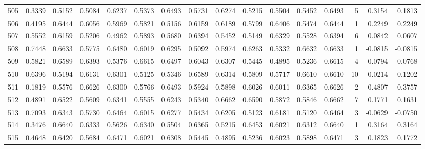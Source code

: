 \begin{tabular}{lrrrrrrrrrrrrrrr}
505 &      0.3339 &  0.5152 &  0.5084 &  0.6237 &  0.5373 &  0.6493 &  0.5731 &  0.6274 &  0.5215 &  0.5504 &   0.5452 &     0.6493 &      5 &                    0.3154 &                     0.1813 \\
506 &      0.4195 &  0.6444 &  0.6056 &  0.5969 &  0.5821 &  0.5156 &  0.6159 &  0.6189 &  0.5799 &  0.6406 &   0.5474 &     0.6444 &      1 &                    0.2249 &                     0.2249 \\
507 &      0.5552 &  0.6159 &  0.5206 &  0.4962 &  0.5893 &  0.5680 &  0.6394 &  0.5452 &  0.5149 &  0.6329 &   0.5528 &     0.6394 &      6 &                    0.0842 &                     0.0607 \\
508 &      0.7448 &  0.6633 &  0.5775 &  0.6480 &  0.6019 &  0.6295 &  0.5092 &  0.5974 &  0.6263 &  0.5332 &   0.6632 &     0.6633 &      1 &                   -0.0815 &                    -0.0815 \\
509 &      0.5821 &  0.6589 &  0.6393 &  0.5376 &  0.6615 &  0.6497 &  0.6043 &  0.6307 &  0.5445 &  0.4895 &   0.5236 &     0.6615 &      4 &                    0.0794 &                     0.0768 \\
510 &      0.6396 &  0.5194 &  0.6131 &  0.6301 &  0.5125 &  0.5346 &  0.6589 &  0.6314 &  0.5809 &  0.5717 &   0.6610 &     0.6610 &     10 &                    0.0214 &                    -0.1202 \\
511 &      0.1819 &  0.5576 &  0.6626 &  0.6300 &  0.5766 &  0.6493 &  0.5924 &  0.5898 &  0.6026 &  0.6011 &   0.6365 &     0.6626 &      2 &                    0.4807 &                     0.3757 \\
512 &      0.4891 &  0.6522 &  0.5609 &  0.6341 &  0.5555 &  0.6243 &  0.5340 &  0.6662 &  0.6590 &  0.5872 &   0.5846 &     0.6662 &      7 &                    0.1771 &                     0.1631 \\
513 &      0.7093 &  0.6343 &  0.5730 &  0.6464 &  0.6015 &  0.6277 &  0.5434 &  0.6205 &  0.5123 &  0.6181 &   0.5120 &     0.6464 &      3 &                   -0.0629 &                    -0.0750 \\
514 &      0.3476 &  0.6640 &  0.6333 &  0.5626 &  0.6340 &  0.5504 &  0.6365 &  0.5215 &  0.6453 &  0.6021 &   0.6312 &     0.6640 &      1 &                    0.3164 &                     0.3164 \\
515 &      0.4648 &  0.6420 &  0.5684 &  0.6471 &  0.6021 &  0.6308 &  0.5445 &  0.4895 &  0.5236 &  0.6023 &   0.5898 &     0.6471 &      3 &                    0.1823 &                     0.1772 \\

\end{tabular}

